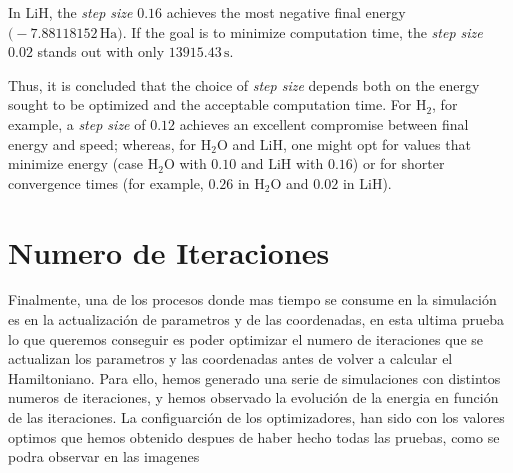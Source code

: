 In \(\mathrm{LiH}\), the \textit{step size} \(0.16\) achieves the most negative final energy \(\bigl(-7.88118152\,\mathrm{Ha}\bigr)\). If the goal is to minimize computation time, the \textit{step size} \(0.02\) stands out with only \(13915.43\,\mathrm{s}\).

Thus, it is concluded that the choice of \textit{step size} depends both on the energy sought to be optimized and the acceptable computation time. For \(\mathrm{H_2}\), for example, a \textit{step size} of \(0.12\) achieves an excellent compromise between final energy and speed; whereas, for \(\mathrm{H_2O}\) and \(\mathrm{LiH}\), one might opt for values that minimize energy (case \(\mathrm{H_2O}\) with \(0.10\) and \(\mathrm{LiH}\) with \(0.16\)) or for shorter convergence times (for example, \(0.26\) in \(\mathrm{H_2O}\) and \(0.02\) in \(\mathrm{LiH}\)).

\section{Numero de Iteraciones}

Finalmente, una de los procesos donde mas tiempo se consume en la simulación es en la actualización de parametros y de las coordenadas, en esta ultima prueba lo que queremos conseguir es poder optimizar el numero de iteraciones que se actualizan los parametros y las coordenadas antes de volver a calcular el Hamiltoniano. Para ello, hemos generado una serie de simulaciones con distintos numeros de iteraciones, y hemos observado la evolución de la energia en función de las iteraciones. La configuarción de los optimizadores, han sido con los valores optimos que hemos obtenido despues de haber hecho todas las pruebas, como se podra observar en las imagenes 